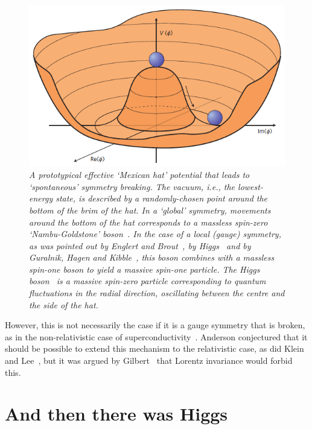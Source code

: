 \documentclass[12pt]{article}
\numberwithin{equation}{section}
\begin{document}
\begin{figure}[h!]
\centering
\includegraphics[scale=0.4]{higgspotential.png}
\caption{\it A prototypical effective `Mexican hat' potential that leads to `spontaneous' symmetry breaking.
The vacuum, i.e., the lowest-energy state, is described by a randomly-chosen point around the bottom of the
brim of the hat. In a `global' symmetry, movements around the bottom of the hat corresponds to a massless spin-zero
`Nambu-Goldstone' boson~\cite{Nambu,Goldstone}. 
In the case of a local (gauge) symmetry, as was pointed out by 
Englert and Brout~\cite{EB}, by Higgs~\cite{H2}
and by Guralnik, Hagen and Kibble~\cite{GHK}, 
this boson combines with a massless spin-one boson to yield a
massive spin-one particle. The Higgs boson~\cite{H2} is a 
massive spin-zero particle corresponding to quantum
fluctuations in the radial direction, oscillating between the centre and the side of the hat.
}
\label{fig:hat}
\end{figure}

However, this
is not necessarily the case if it is a gauge symmetry that is broken,
as in the non-relativistic case of superconductivity~\cite{Anderson}.
Anderson conjectured that it should be possible to extend this
mechanism to the relativistic case, as did Klein and Lee~\cite{KL},
but it was argued by Gilbert~\cite{Gilbert} that Lorentz invariance
would forbid this.


\section{And then there was Higgs}
\end{document}
